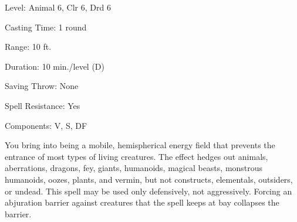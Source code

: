 
\begin{description*}
\item[Level:] Animal 6, Clr 6, Drd 6
\item[Casting Time:] 1 round
\item[Range:] 10 ft.
\item[Duration:] 10 min./level (D)
\item[Saving Throw:] None
\item[Spell Resistance:] Yes
\item[Components:] V, S, DF
\end{description*}

You bring into being a mobile, hemispherical energy field that prevents the entrance
of most types of living creatures.
The effect hedges out animals, aberrations, dragons, fey, giants, humanoids, magical
beasts, monstrous humanoids, oozes, plants, and vermin, but not constructs, elementals,
outsiders, or undead.
This spell may be used only defensively, not aggressively. Forcing an abjuration
barrier against creatures that the spell keeps at bay collapses the barrier.
